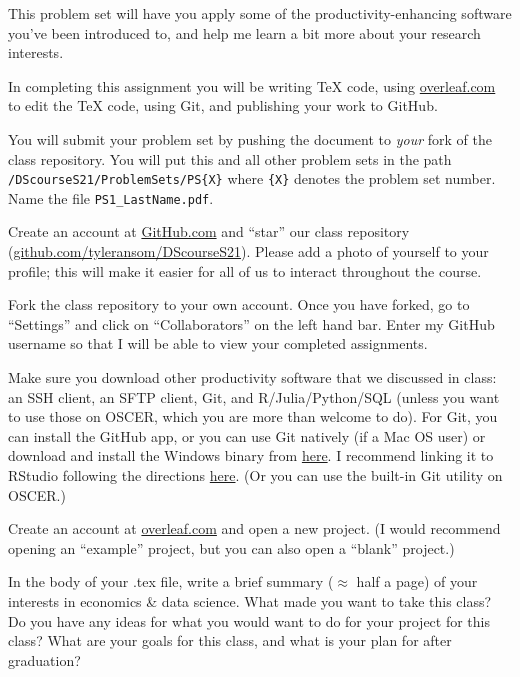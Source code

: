 \documentclass[12pt,english]{exam}
\begin{document}
This problem set will have you apply some of the productivity-enhancing software you've been introduced to, and help me learn a bit more about your research interests.

In completing this assignment you will be writing TeX code, using \url{overleaf.com} to edit the TeX code, using Git, and publishing your work to GitHub.

You will submit your problem set by pushing the document to \emph{your} fork of the class repository. You will put this and all other problem sets in the path \texttt{/DScourseS21/ProblemSets/PS\{X\}} where \texttt{\{X\}} denotes the problem set number. Name the file \texttt{PS1\_LastName.pdf}.

\begin{questions}
\question Create an account at \url{GitHub.com} and ``star'' our class repository (\url{github.com/tyleransom/DScourseS21}). Please add a photo of yourself to your profile; this will make it easier for all of us to interact throughout the course.

\question Fork the class repository to your own account. Once you have forked, go to ``Settings'' and click on ``Collaborators'' on the left hand bar. Enter my GitHub username so that I will be able to view your completed assignments.

\question Make sure you download other productivity software that we discussed in class: an SSH client, an SFTP client, Git, and R/Julia/Python/SQL (unless you want to use those on OSCER, which you are more than welcome to do). For Git, you can install the GitHub app, or you can use Git natively (if a Mac OS user) or download and install the Windows binary from \href{https://git-scm.com/download/win}{here}. I recommend linking it to RStudio following the directions \href{https://raw.githack.com/uo-ec607/lectures/master/02-git/02-Git.html#13}{here}. (Or you can use the built-in Git utility on OSCER.)

\question Create an account at \url{overleaf.com} and open a new project. (I would recommend opening an ``example'' project, but you can also open a ``blank'' project.)

\question In the body of your .tex file, write a brief summary ($\approx$ half a page) of your interests in economics \& data science. What made you want to take this class? Do you have any ideas for what you would want to do for your project for this class? What are your goals for this class, and what is your plan for after graduation?


\end{questions}
\end{document}
